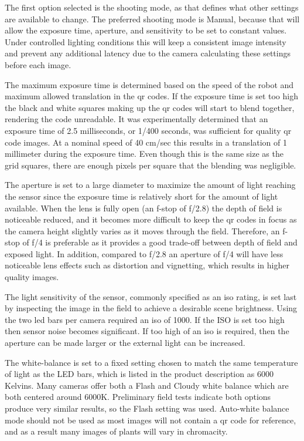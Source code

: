 The first option selected is the shooting mode, as that defines what other settings are available to change.  The preferred shooting mode is Manual, because that will allow the exposure time, aperture, and sensitivity to be set to constant values.  Under controlled lighting conditions this will keep a consistent image intensity and prevent any additional latency due to the camera calculating these settings before each image.

The maximum exposure time is determined based on the speed of the robot and maximum allowed translation in the \ac{qr} codes.  If the exposure time is set too high the black and white squares making up the \ac{qr} codes will start to blend together, rendering the code unreadable.  It was experimentally determined that an exposure time of 2.5 milliseconds, or 1/400 seconds, was sufficient for quality \ac{qr} code images.  At a nominal speed of 40 cm/sec this results in a translation of 1 millimeter during the exposure time.  Even though this is the same size as the grid squares, there are enough pixels per square that the blending was negligible. 

The aperture is set to a large diameter to maximize the amount of light reaching the sensor since the exposure time is relatively short for the amount of light available.  When the lens is fully open (an f-stop of f/2.8) the depth of field is noticeable reduced, and it becomes more difficult to keep the \ac{qr} codes in focus as the camera height slightly varies as it moves through the field.  Therefore, an f-stop of f/4 is preferable as it provides a good trade-off between depth of field and exposed light.  In addition, compared to f/2.8 an aperture of f/4 will have less noticeable lens effects such as distortion and vignetting, which results in higher quality images.  

The light sensitivity of the sensor, commonly specified as an \ac{iso} rating, is set last by inspecting the image in the field to achieve a desirable scene brightness.  Using the two \ac{led} bars per camera required an \ac{iso} of 1000.  If the ISO is set too high then sensor noise becomes significant.  If too high of an \ac{iso} is required, then the aperture can be made larger or the external light can be increased.  

The white-balance is set to a fixed setting chosen to match the same temperature of light as the LED bars, which is listed in the product description as 6000 Kelvins.  Many cameras offer both a Flash and Cloudy white balance which are both centered around 6000K.   Preliminary field tests indicate both options produce very similar results, so the Flash setting was used.  Auto-white balance mode should not be used as most images will not contain a \ac{qr} code for reference, and as a result many images of plants will vary in chromacity. 

